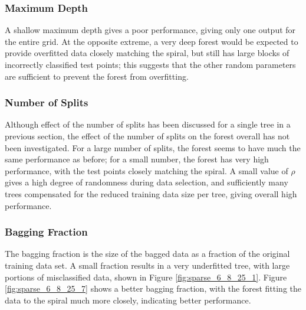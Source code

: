 \documentclass[a4paper, 10pt, conference]{ieeeconf}
\begin{document}
\subsubsection{Maximum Depth}

A shallow maximum depth gives a poor performance, giving only one output for the entire grid. At the opposite extreme, a very deep forest would be expected to provide overfitted data closely matching the spiral, but still has large blocks of incorrectly classified test points; this suggests that the other random parameters are sufficient to prevent the forest from overfitting.


\subsubsection{Number of Splits}

Although effect of the number of splits has been discussed for a single tree in a previous section, the effect of the number of splits on the forest overall has not been investigated. For a large number of splits, the forest seems to have much the same performance as before; for a small number, the forest has very high performance, with the test points closely matching the spiral. A small value of $\rho$ gives a high degree of randomness during data selection, and sufficiently many trees compensated for the reduced training data size per tree, giving overall high performance.

\subsubsection{Bagging Fraction}

The bagging fraction is the size of the bagged data as a fraction of the original training data set. A small fraction results in a very underfitted tree, with large portions of misclassified data, shown in Figure \ref{fig:sparse_6_8_25_1}. Figure \ref{fig:sparse_6_8_25_7} shows a better bagging fraction, with the forest fitting the data to the spiral much more closely, indicating better performance.


\end{document}
